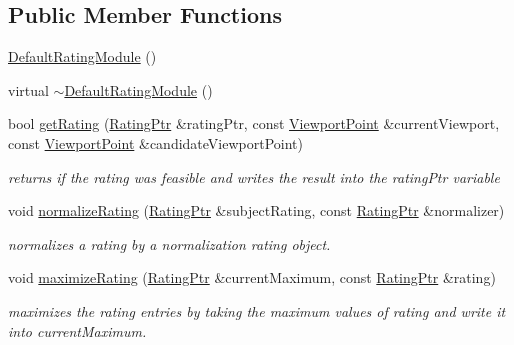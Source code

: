 \subsection*{\-Public \-Member \-Functions}
\begin{DoxyCompactItemize}
\item 
\hyperlink{classnext__best__view_1_1DefaultRatingModule_a01596dd2a2444ec1e52db5c7b57c28ac}{\-Default\-Rating\-Module} ()
\item 
virtual \hyperlink{classnext__best__view_1_1DefaultRatingModule_a80b1655c699f6d1a8369a764d07f6d55}{$\sim$\-Default\-Rating\-Module} ()
\item 
bool \hyperlink{classnext__best__view_1_1DefaultRatingModule_a7af840273ead9ce348eddc4f2b804254}{get\-Rating} (\hyperlink{namespacenext__best__view_a24cf26ec1dec2cc4c167e32798d1abeb}{\-Rating\-Ptr} \&rating\-Ptr, const \hyperlink{namespacenext__best__view_adc2a48dc71f39dea04334b16d75a8e34}{\-Viewport\-Point} \&current\-Viewport, const \hyperlink{namespacenext__best__view_adc2a48dc71f39dea04334b16d75a8e34}{\-Viewport\-Point} \&candidate\-Viewport\-Point)
\begin{DoxyCompactList}\small\item\em returns if the rating was feasible and writes the result into the rating\-Ptr variable \end{DoxyCompactList}\item 
void \hyperlink{classnext__best__view_1_1DefaultRatingModule_acefb9ef90c21219429718dc95e301c98}{normalize\-Rating} (\hyperlink{namespacenext__best__view_a24cf26ec1dec2cc4c167e32798d1abeb}{\-Rating\-Ptr} \&subject\-Rating, const \hyperlink{namespacenext__best__view_a24cf26ec1dec2cc4c167e32798d1abeb}{\-Rating\-Ptr} \&normalizer)
\begin{DoxyCompactList}\small\item\em normalizes a rating by a normalization rating object. \end{DoxyCompactList}\item 
void \hyperlink{classnext__best__view_1_1DefaultRatingModule_ab46cd58bd34cba50a225735f5aebbd41}{maximize\-Rating} (\hyperlink{namespacenext__best__view_a24cf26ec1dec2cc4c167e32798d1abeb}{\-Rating\-Ptr} \&current\-Maximum, const \hyperlink{namespacenext__best__view_a24cf26ec1dec2cc4c167e32798d1abeb}{\-Rating\-Ptr} \&rating)
\begin{DoxyCompactList}\small\item\em maximizes the rating entries by taking the maximum values of rating and write it into current\-Maximum. \end{DoxyCompactList}\item 

\end{DoxyCompactItemize}
